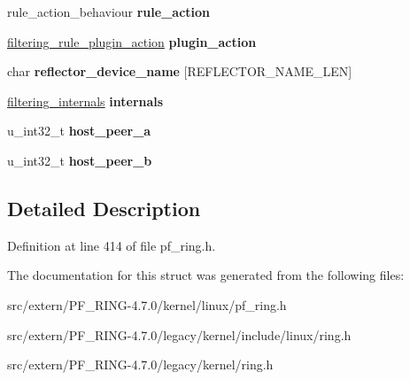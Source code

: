 \begin{DoxyCompactItemize}
\item 
\hypertarget{structhash__filtering__rule_a8c7db97c8e24c519119ec63edb70fa28}{
rule\_\-action\_\-behaviour {\bfseries rule\_\-action}}
\label{structhash__filtering__rule_a8c7db97c8e24c519119ec63edb70fa28}

\item 
\hypertarget{structhash__filtering__rule_afe0714348082859a76e78a8a6827b090}{
\hyperlink{structfiltering__rule__plugin__action}{filtering\_\-rule\_\-plugin\_\-action} {\bfseries plugin\_\-action}}
\label{structhash__filtering__rule_afe0714348082859a76e78a8a6827b090}

\item 
\hypertarget{structhash__filtering__rule_af377ef07c865782b112ccd1b6636090a}{
char {\bfseries reflector\_\-device\_\-name} \mbox{[}REFLECTOR\_\-NAME\_\-LEN\mbox{]}}
\label{structhash__filtering__rule_af377ef07c865782b112ccd1b6636090a}

\item 
\hypertarget{structhash__filtering__rule_a72990499c50ac8a838d5aa2d3208a6e4}{
\hyperlink{structfiltering__internals}{filtering\_\-internals} {\bfseries internals}}
\label{structhash__filtering__rule_a72990499c50ac8a838d5aa2d3208a6e4}

\item 
\hypertarget{structhash__filtering__rule_a2fad42ef72fa4a10b6bacaf407b4012d}{
u\_\-int32\_\-t {\bfseries host\_\-peer\_\-a}}
\label{structhash__filtering__rule_a2fad42ef72fa4a10b6bacaf407b4012d}

\item 
\hypertarget{structhash__filtering__rule_a9b6adf25633d1194601b7a266cb5174b}{
u\_\-int32\_\-t {\bfseries host\_\-peer\_\-b}}
\label{structhash__filtering__rule_a9b6adf25633d1194601b7a266cb5174b}

\end{DoxyCompactItemize}


\subsection{Detailed Description}


Definition at line 414 of file pf\_\-ring.h.



The documentation for this struct was generated from the following files:\begin{DoxyCompactItemize}
\item 
src/extern/PF\_\-RING-\/4.7.0/kernel/linux/pf\_\-ring.h\item 
src/extern/PF\_\-RING-\/4.7.0/legacy/kernel/include/linux/ring.h\item 
src/extern/PF\_\-RING-\/4.7.0/legacy/kernel/ring.h\end{DoxyCompactItemize}
